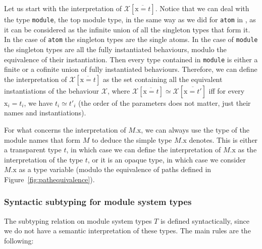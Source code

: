 \documentclass[a4paper,10pt]{article}
\newcommand{\tx}{\textrm{x}}
\newcommand{\BX}{\ensuremath{\mathcal{X}}}
\begin{document}
Let us start with the interpretation of $\BX[\overline{\tx=t}]$. Notice that we can deal with the type \texttt{module}, the top module type, in the same way as we did for \texttt{atom} in \cite{CD25}, as it can be considered as the infinite union of all the singleton types that form it. In the case of \texttt{atom} the singleton types are the single atoms. In the case of \texttt{module} the singleton types are all the fully instantiated behaviours, modulo the equivalence of their instantiation. Then every type contained in \texttt{module} is either a finite or a cofinite union of fully instantiated behaviours.
Therefore, we can define the interpretation of $\BX[\overline{\tx=t}]$ as the set containing all the equivalent instantiations of the behaviour $\BX$, where $\BX[\overline{\tx=t}]\simeq\BX[\overline{\tx=t'}]$ iff for every $\tx_i=t_i$, we have $t_i\simeq t'_i$ (the order of the parameters does not matter, just their names and instantiations).

For what concerns the interpretation of $M.\tx$, we can always use the type of the module names that form $M$ to deduce the simple type $M.\tx$ denotes. This is either a transparent type $t$, in which case we can define the interpretation of $M.\tx$ as the interpretation of the type $t$, or it is an opaque type, in which case we consider $M.\tx$ as a type variable (modulo the equivalence of paths defined in Figure~\ref{fig:pathequivalence}).


\subsubsection{Syntactic subtyping for module system types}
The subtyping relation on module system types $T$ is defined syntactically, since we do not have a semantic interpretation of these types. The main rules are the following:
\end{document}
